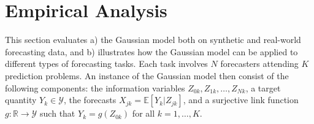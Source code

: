 \documentclass[11pt]{article}
\newcommand{\R}{\mathbb{R}}
\newcommand{\E}{\mathbb{E}}
\theoremstyle{definition}
\theoremstyle{definition}
\def\bSigma{{\bf \Sigma}}
\def\E{{\mathbb E}}
\begin{document}

%
 













\section{Empirical Analysis}
\label{empirical}
This section evaluates a) the Gaussian model both on synthetic and real-world forecasting data, and b) illustrates how the Gaussian model can be applied to different types of forecasting tasks. Each task involves $N$ forecasters attending $K$ prediction problems. An instance of the Gaussian model then consist of the following components: the information variables $Z_{0k}, Z_{1k}, \dots, Z_{Nk}$, a target quantity $Y_k  \in \mathcal{Y}$, the forecasts $X_{jk} = \E[Y_k | Z_{jk}]$, and a surjective link function $g: \R \to \mathcal{Y}$ such that $Y_k = g(Z_{0k})$ for all $k = 1, \dots, K$.
%
%
\end{document}
